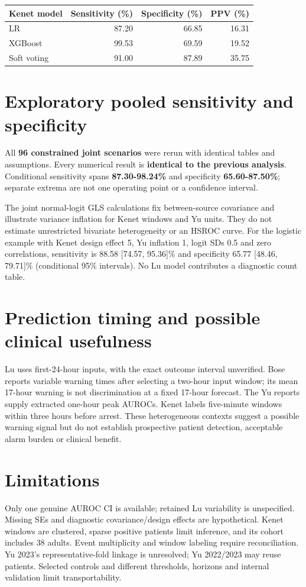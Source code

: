 \documentclass[10pt,a4paper]{article}
\begin{document}
\begin{center}\small
\begin{tabular}{l r r r}
\toprule Kenet model & Sensitivity (\%) & Specificity (\%) & PPV (\%) \\
\midrule
LR & 87.20 & 66.85 & 16.31 \\
XGBoost & 99.53 & 69.59 & 19.52 \\
Soft voting & 91.00 & 87.89 & 35.75 \\
\bottomrule
\end{tabular}\end{center}
\section*{Exploratory pooled sensitivity and specificity}
All \textbf{96 constrained joint scenarios} were rerun with identical tables and assumptions. Every numerical result is \textbf{identical to the previous analysis}. Conditional sensitivity spans \textbf{87.30-98.24\%} and specificity \textbf{65.60-87.50\%}; separate extrema are not one operating point or a confidence interval.

The joint normal-logit GLS calculations fix between-source covariance and illustrate variance inflation for Kenet windows and Yu units. They do not estimate unrestricted bivariate heterogeneity or an HSROC curve. For the logistic example with Kenet design effect 5, Yu inflation 1, logit SDs 0.5 and zero correlations, sensitivity is 88.58 [74.57, 95.36]\% and specificity 65.77 [48.46, 79.71]\% (conditional 95\% intervals). No Lu model contributes a diagnostic count table.
\section*{Prediction timing and possible clinical usefulness}
Lu uses first-24-hour inputs, with the exact outcome interval unverified. Bose reports variable warning times after selecting a two-hour input window; its mean 17-hour warning is not discrimination at a fixed 17-hour forecast. The Yu reports supply extracted one-hour peak AUROCs. Kenet labels five-minute windows within three hours before arrest. These heterogeneous contexts suggest a possible warning signal but do not establish prospective patient detection, acceptable alarm burden or clinical benefit.
\section*{Limitations}
Only one genuine AUROC CI is available; retained Lu variability is unspecified. Missing SEs and diagnostic covariance/design effects are hypothetical. Kenet windows are clustered, sparse positive patients limit inference, and its cohort includes 38 adults. Event multiplicity and window labeling require reconciliation. Yu 2023's representative-fold linkage is unresolved; Yu 2022/2023 may reuse patients. Selected controls and different thresholds, horizons and internal validation limit transportability.
\end{document}
